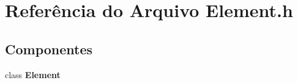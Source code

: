 \section{Referência do Arquivo Element.\+h}
\label{_flow_forecast_2_element_8h}
\subsection*{Componentes}
\begin{DoxyCompactItemize}
\item 
class {\bf Element}
\end{DoxyCompactItemize}
